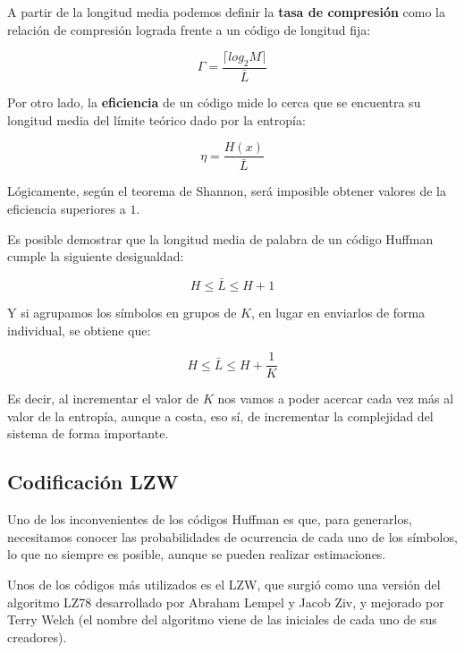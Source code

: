 \documentclass[es,apuntes]{uah}
\begin{document}
A partir de la longitud media podemos definir la {\bf tasa de compresión} como la relación de compresión lograda frente a un código de longitud fija:

\begin{equation}
	\Gamma = \frac{\lceil log_2 M \rceil}{\bar{L}}
\end{equation}

Por otro lado, la {\bf eficiencia} de un código mide lo cerca que se encuentra su longitud media del límite teórico dado por la entropía:

\begin{equation}
	\eta = \frac{H(x)}{\bar{L}}
\end{equation}

Lógicamente, según el teorema de Shannon, será imposible obtener valores de la eficiencia superiores a $1$. 

Es posible demostrar que la longitud media de palabra de un código Huffman cumple la siguiente desigualdad:

\begin{equation}
	H \leq \bar{L} \leq H+1
\end{equation}

Y si agrupamos los símbolos en grupos de $K$, en lugar en enviarlos de forma individual, se obtiene que:

\begin{equation}
	H \leq \bar{L} \leq H + \frac{1}{K}
\end{equation}

Es decir, al incrementar el valor de $K$ nos vamos a poder acercar cada vez más al valor de la entropía, aunque a costa, eso sí, de incrementar la complejidad del sistema de forma importante. 

\subsection{Codificación LZW}

Uno de los inconvenientes de los códigos Huffman es que, para generarlos, necesitamos conocer las probabilidades de ocurrencia de cada uno de los símbolos, lo que no siempre es posible, aunque se pueden realizar estimaciones. 

Unos de los códigos más utilizados es el LZW, que surgió como una versión del algoritmo LZ78 desarrollado por Abraham Lempel y Jacob Ziv, y mejorado por Terry Welch (el nombre del algoritmo viene de las iniciales de cada uno de sus creadores). 
\end{document}
